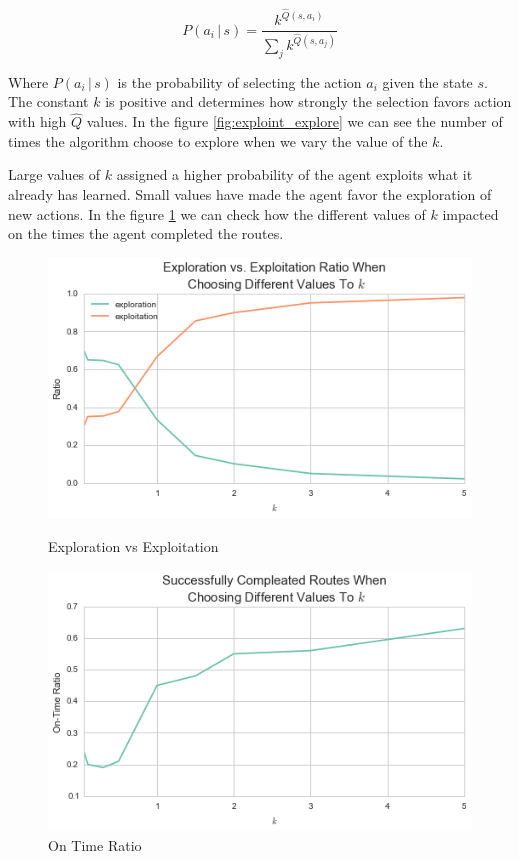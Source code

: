\documentclass[a4paper]{article}
\begin{document}
$$P(a_i\, | \,s ) = \frac{k ^{\hat{Q}(s, a_i)}}{\sum_j k^{\hat{Q}(s, a_j)}}$$

Where $P(a_i\, | \,s )$ is the probability of selecting the action $a_i$ given the state $s$. The constant $k$ is positive and determines how strongly the selection favors action with high $\hat{Q}$ values. In the figure \ref{fig:exploint_explore} we can see the number of times the algorithm choose to explore when we vary the value of the $k$.

Large values of $k$ assigned a higher probability of the agent exploits what it already has learned. Small values have made the agent favor the exploration of new actions. In the figure \ref{fig:success_runs} we can check how the different values of $k$ impacted on the times the agent completed the routes.

\begin{figure}[ht!]
  \includegraphics[width=\linewidth]{images/exploint_explore.png}
  \caption{\label{fig:exploint_explore}Exploration vs Exploitation}
\endminipage
{}
  \includegraphics[width=\linewidth]{images/success_runs.png}
  \caption{\label{fig:success_runs}On Time Ratio}
\endminipage
\end{figure}
\end{document}
